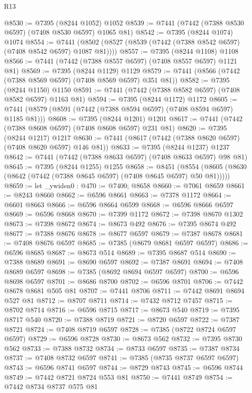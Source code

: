 \begin{lexlean}{R13}
\begin{coremodule}
@8530 := @7395 (@8244 @1052) @1052
@8539 := @7441 (@7442 (@7388 @8530 @6597) (@7408 @8530 @6597) @1065 @81)
@8542 := @7395 (@8244 @1074) @1074
@8554 := @7441 (@8502 (@8527 (@8539 (@7442 (@7388 @8542 @6597) (@7408 @8542 @6597) @1087 @81))))
@8557 := @7395 (@8244 @1108) @1108
@8566 := @7441 (@7442 (@7388 @8557 @6597) (@7408 @8557 @6597) @1121 @81)
@8569 := @7395 (@8244 @1129) @1129
@8579 := @7441 (@8566 (@7442 (@7388 @8569 @6597) (@7408 @8569 @6597) @351 @81))
@8582 := @7395 (@8244 @1150) @1150
@8591 := @7441 (@7442 (@7388 @8582 @6597) (@7408 @8582 @6597) @1163 @81)
@8594 := @7395 (@8244 @1172) @1172
@8605 := @7441 (@8579 (@8591 (@7442 (@7388 @8594 @6597) (@7408 @8594 @6597) @1185 @81)))
@8608 := @7395 (@8244 @1201) @1201
@8617 := @7441 (@7442 (@7388 @8608 @6597) (@7408 @8608 @6597) @231 @81)
@8620 := @7395 (@8244 @1217) @1217
@8630 := @7441 (@8617 (@7442 (@7388 @8620 @6597) (@7408 @8620 @6597) @146 @81))
@8633 := @7395 (@8244 @1237) @1237
@8642 := @7441 (@7442 (@7388 @8633 @6597) (@7408 @8633 @6597) @98 @81)
@8645 := @7395 (@8244 @1255) @1255
@8658 := @8451
    (@8554 (@8605 (@8630 (@8642 (@7442 (@7388 @8645 @6597) (@7408 @8645 @6597) @50 @81)))))
@8659 := let _ywiden0 : @470 := @7400; @8658
@8660 := @7061 @8659
@8661 := @8243 @8660
@8662 := @6596 @8661
@8663 := @7378 @1172
@8664 := @6601 @8663
@8666 := @6596 @8664 @6599
@8668 := @6596 @8666 @6597
@8669 := @6596 @8668
@8670 := @7399 @1172
@8672 := @7398 @8670 @1302
@8673 := @7398 @8672
@8674 := @8673 @492
@8676 := @7395 @8674 @492
@8677 := @7388 @8676
@8678 := @8677 @6597
@8679 := @7387 @8678
@8681 := @7408 @8676 @6597
@8685 := @7385 (@8679 @8681 @6597 @6597)
@8686 := @6596 @8685
@8687 := @8673 @514
@8689 := @7395 @8687 @514
@8690 := @7388 @8689
@8691 := @8690 @6597
@8692 := @7387 @8691
@8694 := @7408 @8689 @6597
@8698 := @7385 (@8692 @8694 @6597 @6597)
@8700 := @6596 @8698 @6597
@8701 := @8686 @8700
@8702 := @6596 @8701
@8706 := @7442 @8678 @8681 @505 @81
@8707 := @7441 @8706
@8711 := @7442 @8691 @8694 @527 @81
@8712 := @8707 @8711
@8714 := @7432 @8712 @7457
@8715 := @8702 @8714
@8716 := @6596 @8715
@8717 := @8673 @540
@8719 := @7395 @8717 @540
@8720 := @7388 @8719
@8721 := @8720 @6597
@8722 := @7387 @8721
@8724 := @7408 @8719 @6597
@8728 := @7385 (@8722 @8724 @6597 @6597)
@8729 := @6596 @8728
@8730 := @8673 @562
@8732 := @7395 @8730 @562
@8733 := @7388 @8732
@8734 := @8733 @6597
@8735 := @7387 @8734
@8737 := @7408 @8732 @6597
@8741 := @7385 (@8735 @8737 @6597 @6597)
@8743 := @6596 @8741 @6597
@8744 := @8729 @8743
@8745 := @6596 @8744
@8749 := @7442 @8721 @8724 @553 @81
@8750 := @7441 @8749
@8754 := @7442 @8734 @8737 @575 @81

\end{coremodule}
\end{lexlean}
